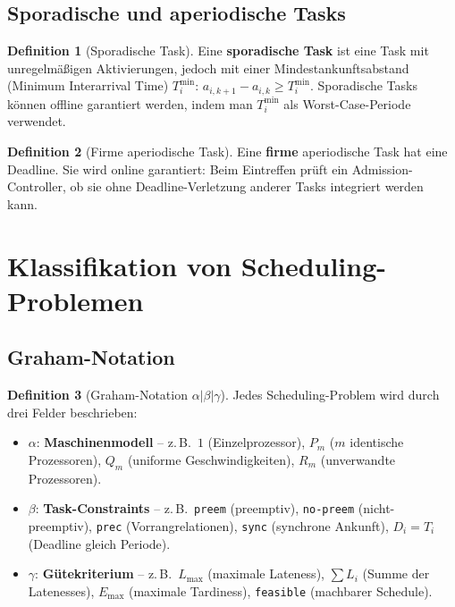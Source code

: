 ﻿\documentclass[a4paper,12pt]{report}
\theoremstyle{definition}
\newtheorem{definition}{Definition}[chapter]
\begin{document}
\subsection{Sporadische und aperiodische Tasks}

\begin{definition}[Sporadische Task]
	Eine \textbf{sporadische Task} ist eine Task mit unregelmäßigen Aktivierungen,
	jedoch mit einer Mindestankunftsabstand (Minimum Interarrival Time) $T_i^{\min}$:
	$a_{i,k+1} - a_{i,k} \geq T_i^{\min}$. Sporadische Tasks können offline
	garantiert werden, indem man $T_i^{\min}$ als Worst-Case-Periode verwendet.
\end{definition}

\begin{definition}[Firme aperiodische Task]
	Eine \textbf{firme} aperiodische Task hat eine Deadline. Sie wird online
	garantiert: Beim Eintreffen prüft ein Admission-Controller, ob sie ohne
	Deadline-Verletzung anderer Tasks integriert werden kann.
\end{definition}

\section{Klassifikation von Scheduling-Problemen}

\subsection{Graham-Notation}

\begin{definition}[Graham-Notation $\alpha|\beta|\gamma$]
	Jedes Scheduling-Problem wird durch drei Felder beschrieben:
	\begin{itemize}
		\item $\alpha$: \textbf{Maschinenmodell} -- z.\,B.\ $1$ (Einzelprozessor),
		      $P_m$ ($m$ identische Prozessoren), $Q_m$ (uniforme Geschwindigkeiten),
		      $R_m$ (unverwandte Prozessoren).
		\item $\beta$: \textbf{Task-Constraints} -- z.\,B.\ \texttt{preem} (preemptiv),
		      \texttt{no-preem} (nicht-preemptiv), \texttt{prec} (Vorrangrelationen),
		      \texttt{sync} (synchrone Ankunft), $D_i = T_i$ (Deadline gleich Periode).
		\item $\gamma$: \textbf{Gütekriterium} -- z.\,B.\ $L_{\max}$ (maximale Lateness),
		      $\sum L_i$ (Summe der Latenesses), $E_{\max}$ (maximale Tardiness),
		      \texttt{feasible} (machbarer Schedule).
	\end{itemize}
\end{definition}
\end{document}
